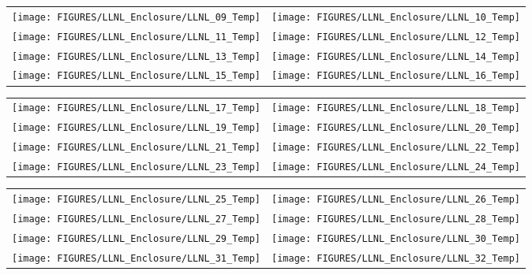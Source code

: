 \begin{figure}[p]
\begin{tabular*}{\textwidth}{l@{\extracolsep{\fill}}r}
\texttt{[image: FIGURES/LLNL\_Enclosure/LLNL\_09\_Temp]} &
\texttt{[image: FIGURES/LLNL\_Enclosure/LLNL\_10\_Temp]} \\
\texttt{[image: FIGURES/LLNL\_Enclosure/LLNL\_11\_Temp]} &
\texttt{[image: FIGURES/LLNL\_Enclosure/LLNL\_12\_Temp]} \\
\texttt{[image: FIGURES/LLNL\_Enclosure/LLNL\_13\_Temp]} &
\texttt{[image: FIGURES/LLNL\_Enclosure/LLNL\_14\_Temp]} \\
\texttt{[image: FIGURES/LLNL\_Enclosure/LLNL\_15\_Temp]} &
\texttt{[image: FIGURES/LLNL\_Enclosure/LLNL\_16\_Temp]}
\end{tabular*}
\label{LLNL_Enclosure_Temp_2}
\end{figure}

\begin{figure}[p]
\begin{tabular*}{\textwidth}{l@{\extracolsep{\fill}}r}
\texttt{[image: FIGURES/LLNL\_Enclosure/LLNL\_17\_Temp]} &
\texttt{[image: FIGURES/LLNL\_Enclosure/LLNL\_18\_Temp]} \\
\texttt{[image: FIGURES/LLNL\_Enclosure/LLNL\_19\_Temp]} &
\texttt{[image: FIGURES/LLNL\_Enclosure/LLNL\_20\_Temp]} \\
\texttt{[image: FIGURES/LLNL\_Enclosure/LLNL\_21\_Temp]} &
\texttt{[image: FIGURES/LLNL\_Enclosure/LLNL\_22\_Temp]} \\
\texttt{[image: FIGURES/LLNL\_Enclosure/LLNL\_23\_Temp]} &
\texttt{[image: FIGURES/LLNL\_Enclosure/LLNL\_24\_Temp]}
\end{tabular*}
\label{LLNL_Enclosure_Temp_3}
\end{figure}

\begin{figure}[p]
\begin{tabular*}{\textwidth}{l@{\extracolsep{\fill}}r}
\texttt{[image: FIGURES/LLNL\_Enclosure/LLNL\_25\_Temp]} &
\texttt{[image: FIGURES/LLNL\_Enclosure/LLNL\_26\_Temp]} \\
\texttt{[image: FIGURES/LLNL\_Enclosure/LLNL\_27\_Temp]} &
\texttt{[image: FIGURES/LLNL\_Enclosure/LLNL\_28\_Temp]} \\
\texttt{[image: FIGURES/LLNL\_Enclosure/LLNL\_29\_Temp]} &
\texttt{[image: FIGURES/LLNL\_Enclosure/LLNL\_30\_Temp]} \\
\texttt{[image: FIGURES/LLNL\_Enclosure/LLNL\_31\_Temp]} &
\texttt{[image: FIGURES/LLNL\_Enclosure/LLNL\_32\_Temp]}
\end{tabular*}
\label{LLNL_Enclosure_Temp_4}
\end{figure}

